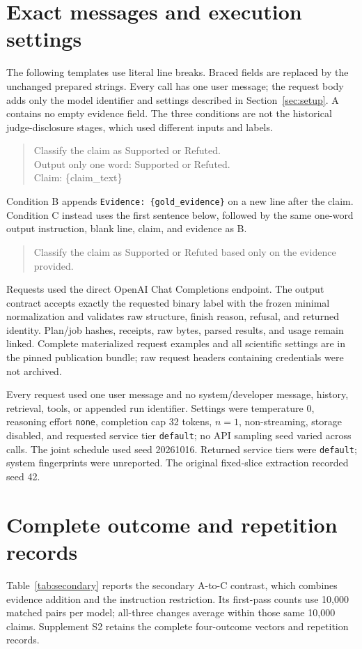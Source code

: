 \documentclass[11pt,letterpaper]{article}
\begin{document}
\section{Exact messages and execution settings}\label{app:messages}
The following templates use literal line breaks. Braced fields are replaced by the unchanged prepared strings. Every call has one user message; the request body adds only the model identifier and settings described in Section~\ref{sec:setup}. A contains no empty evidence field. The three conditions are not the historical judge-disclosure stages, which used different inputs and labels.
\begin{quote}\small\ttfamily
Classify the claim as Supported or Refuted.\\
Output only one word: Supported or Refuted.\\[4pt]
Claim: \{claim\_text\}
\end{quote}
Condition B appends \texttt{Evidence: \{gold\_evidence\}} on a new line after the claim. Condition C instead uses the first sentence below, followed by the same one-word output instruction, blank line, claim, and evidence as B.
\begin{quote}\small\ttfamily
Classify the claim as Supported or Refuted based only on the evidence provided.
\end{quote}
Requests used the direct OpenAI Chat Completions endpoint. The output contract accepts exactly the requested binary label with the frozen minimal normalization and validates raw structure, finish reason, refusal, and returned identity. Plan/job hashes, receipts, raw bytes, parsed results, and usage remain linked. Complete materialized request examples and all scientific settings are in the pinned publication bundle; raw request headers containing credentials were not archived.

Every request used one user message and no system/developer message, history, retrieval, tools, or appended run identifier. Settings were temperature 0, reasoning effort \texttt{none}, completion cap 32 tokens, $n=1$, non-streaming, storage disabled, and requested service tier \texttt{default}; no API sampling seed varied across calls. The joint schedule used seed 20261016. Returned service tiers were \texttt{default}; system fingerprints were unreported. The original fixed-slice extraction recorded seed 42.

\section{Complete outcome and repetition records}\label{app:outcomes}
Table~\ref{tab:secondary} reports the secondary A-to-C contrast, which combines evidence addition and the instruction restriction. Its first-pass counts use 10,000 matched pairs per model; all-three changes average within those same 10,000 claims. Supplement S2 retains the complete four-outcome vectors and repetition records.
\end{document}
